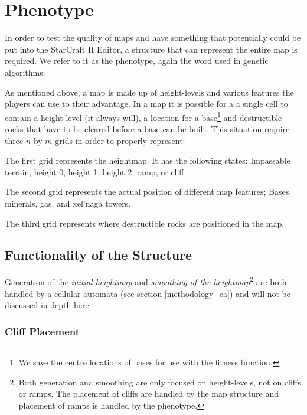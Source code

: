 \section{Phenotype}
\label{methodology_phenotype}

In order to test the quality of maps and have something that potentially could be put into the StarCraft II Editor, a structure that can represent the entire map is required. We refer to it as the phenotype, again the word used in genetic algorithms.

As mentioned above, a map is made up of height-levels and various features the players can use to their advantage. In a map it is possible for a a single cell to contain a height-level (it always will), a location for a base\footnote{We save the centre locations of bases for use with the fitness function.} and destructible rocks that have to be cleared before a base can be built. This situation require three $n$-by-$m$ grids in order to properly represent:

\begin{my_itemize}

	\item The first grid represents the heightmap. It has the following states: Impassable terrain, height 0, height 1, height 2, ramp, or cliff.

	\item The second grid represents the actual position of different map features; Bases, minerals, gas, and xel'naga towers.

	\item The third grid represents where destructible rocks are positioned in the map.

\end{my_itemize}

\subsection{Functionality of the Structure}
\label{methodology_phenotype_functionality}

Generation of the \textit{initial heightmap} and \textit{smoothing of the heightmap}\footnote{Both generation and smoothing are only focused on height-levels, not on cliffs or ramps. The placement of cliffs are handled by the map structure and placement of ramps is handled by the phenotype.} are both handled by a cellular automata (see section \ref{methodology_ca}) and will not be discussed in-depth here.

\subsubsection*{Cliff Placement}

